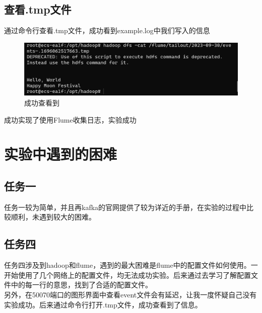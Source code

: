 \subsection{查看.tmp文件}
通过命令行查看.tmp文件，成功看到example.log中我们写入的信息
\begin{figure}[H]
  \centering
  \includegraphics[width=\textwidth]{figure/成功查看到.png}
  \caption{成功查看到}
  \label{fig:my_label}
\end{figure}

成功实现了使用Flume收集日志，实验成功

\section{实验中遇到的困难}
\subsection{任务一}
任务一较为简单，并且再kafka的官网提供了较为详近的手册，在实验的过程中比较顺利，未遇到较大的困难。
\subsection{任务四}
任务四涉及到hadoop和flume，遇到的最大困难是flume中的配置文件如何使用。一开始使用了几个网络上的配置文件，均无法成功实验。后来通过去学习了解配置文件中的每一行的意思，找到了合适的配置文件。\\
另外，在50070端口的图形界面中查看event文件会有延迟，让我一度怀疑自己没有实验成功。后来通过命令行打开.tmp文件，成功查看到了信息。